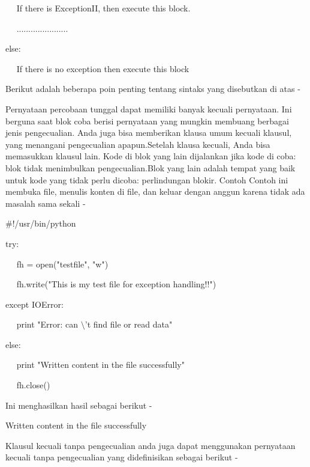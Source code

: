 ~~ If there is ExceptionII, then execute this block. 

~~ ...................... 

else: 

~~ If there is no exception then execute this block 
\vspace{12pt}
\vspace{12pt}

Berikut adalah beberapa poin penting tentang sintaks yang disebutkan di atas - 

 \hspace*{0.5in} \vspace{12pt}
\vspace{12pt}

 \hspace*{0.5in} Pernyataan percobaan tunggal dapat memiliki banyak kecuali pernyataan. Ini berguna saat blok coba berisi pernyataan yang mungkin membuang berbagai jenis pengecualian. $  $Anda juga bisa memberikan klausa umum kecuali klausul, yang menangani pengecualian apapun.Setelah klausa kecuali, Anda bisa memasukkan klausul lain. Kode di blok yang lain dijalankan jika kode di coba: blok tidak menimbulkan pengecualian.Blok yang lain adalah tempat yang baik untuk kode yang tidak perlu dicoba: perlindungan blokir. Contoh Contoh ini membuka file, menulis konten di file, dan keluar dengan anggun karena tidak ada masalah sama sekali - 
\vspace{16pt}

 $  \#  $!/usr/bin/python 
\vspace{12pt}
 
try: 

~~ fh = open("testfile", "w") 

~~ fh.write("This is my test file for exception handling!!") 

except IOError: 

~~ print "Error: can $  \setminus  $'t find file or read data" 

else: 

~~ print "Written content in the file successfully" 

~~ fh.close() 
\vspace{16pt}

Ini menghasilkan hasil sebagai berikut - 
\vspace{12pt}

Written content in the file successfully 
\vspace{12pt}
 
Klausul kecuali tanpa pengecualian anda juga dapat menggunakan pernyataan kecuali tanpa pengecualian yang didefinisikan sebagai berikut - 
\vspace{12pt}

